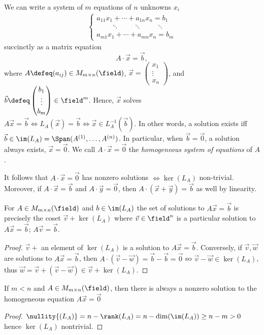 We can write a system of $m$ equations of $n$ unknowns $x_i$
\begin{align*}
    \begin{cases}
        a_{11}x_1 + \cdots + a_{1n}x_n = b_1\\
        \qquad \ddots \qquad \ddots \qquad \ddots \\
        a_{m1}x_1 + \cdots + a_{mn}x_n = b_m
    \end{cases}
\end{align*}
succinctly as a matrix equation \[
A \cdot \vec{x} = \vec{b},    
\]
where $A \defeq (a_{ij}) \in M_{m \times n}(\field)$, $\vec{x} = \begin{pmatrix}
    x_1\\
    \vdots\\
    x_n
\end{pmatrix}$, and $\vec{b} \defeq \begin{pmatrix}
    b_1\\
    \vdots\\
    b_m
\end{pmatrix} \in \field^m$. Hence, $\vec{x}$ solves $A \vec{x} = \vec{b} \iff L_{A}(\vec{x}) = \vec{b} \iff \vec{x} \in L_{A}^{-1}(\vec{b})$. In other words, a solution exists iff $\vec{b} \in \im(L_A) = \Span(A^{(1)}, \dots, A^{(n)})$. In particular, when $\vec{b} = \vec{0}$, a solution always exists, $\vec{x} = \vec{0}$. We call $A \cdot \vec{x} = \vec{0}$ the \emph{homogeneous system of equations} of $A$. 

It follows that $A \cdot \vec{x} = \vec{0}$ has nonzero solutions $\iff \ker(L_A)$ non-trivial. Moreover, if $A \cdot \vec{x} = \vec{b}$ and $A \cdot \vec{y} = \vec{0}$, then $A\cdot (\vec{x} + \vec{y}) = \vec{b}$ as well by linearity.

\begin{proposition}\label{prop:kernelcoset}
    For $A \in M_{m \times n}(\field)$ and $b \in \im(L_A)$ the set of solutions to $A\vec{x} = \vec{b}$ is precisely the coset $\vec{v} + \ker(L_A)$ where $\vec{v} \in \field^n$ is a particular solution to $A \vec{x} = \vec{b}$; $A \vec{v} = \vec{b}$.
\end{proposition}

\begin{proof}
    $\vec{v} + $ an element of $\ker(L_A)$ is a solution to $A \vec{x} = \vec{b}$. Conversely, if $\vec{v}, \vec{w}$ are solutions to $A \vec{x} = \vec{b}$, then $A \cdot (\vec{v} - \vec{w}) = \vec{b} - \vec{b} = \vec{0}$ so $\vec{v} - \vec{w} \in \ker(L_A)$, thus $\vec{w} = \vec{v} + (\vec{v} - \vec{w}) \in \vec{v} + \ker(L_{A})$.
\end{proof}

\begin{corollary}
    If $m < n$ and $A \in M_{m \times n}(\field)$, then there is always a nonzero solution to the homogeneous equation $A \vec{x} = \vec{0}$
\end{corollary}

\begin{proof}
    $\nullity{(L_A)} = n - \rank(L_A) = n - \dim(\im(L_A)) \geq n - m > 0$ hence $\ker(L_A)$ nontrivial.
\end{proof}
